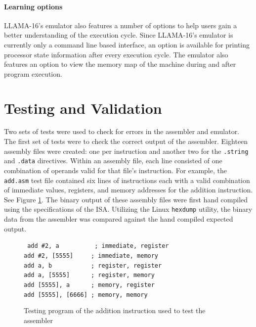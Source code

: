 \documentclass[man,hidelinks,floatsintext]{apa7}
\begin{document}
\paragraph{Learning options}
LLAMA-16's emulator also features a number of options to help users gain a better understanding of the execution cycle. Since LLAMA-16's emulator is currently only a command line based interface, an option is available for printing processor state information after every execution cycle. The emulator also features an option to view the memory map of the machine during and after program execution.
\section{Testing and Validation}
Two sets of tests were used to check for errors in the assembler and emulator. The first set of tests were to check the correct output of the assembler. Eighteen assembly files were created: one per instruction and another two for the \verb|.string| and \verb|.data| directives. Within an assembly file, each line consisted of one combination of operands valid for that file's instruction. For example, the \verb|add.asm| test file contained six lines of instructions each with a valid combination of immediate values, registers, and memory addresses for the addition instruction. See Figure \ref{fig:addtest}.  The binary output of these assembly files were first hand compiled using the specifications of the ISA. Utilizing the Linux \verb|hexdump| utility, the binary data from the assembler was compared against the hand compiled expected output.\par
\vspace*{3mm}
\begin{figure}[h]
  \centering
  \captionsetup{justification=centering}
  \begin{singlespace}
  \verb| add #2, a          ; immediate, register|\\
  \verb|add #2, [5555]     ; immediate, memory  |\\
  \verb|add a, b           ; register, register |\\
  \verb|add a, [5555]      ; register, memory   |\\
  \verb|add [5555], a      ; memory, register   |\\
  \verb|add [5555], [6666] ; memory, memory     |\\
  \end{singlespace}
  \vspace*{3mm}
  \caption{Testing program of the addition instruction used to test the assembler}
  \label{fig:addtest}
\end{figure}
\end{document}
